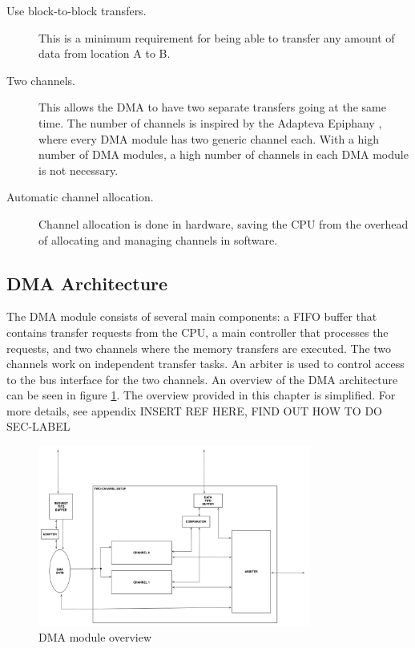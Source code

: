 \begin{description}
	\item[Use block-to-block transfers.] This is a minimum requirement for being
	able to transfer any amount of data from location A to B.
	\item[Two channels.] This allows the DMA to have two separate transfers going
	at the same time.
	The number of channels is inspired by the Adapteva Epiphany \cite{epiphany}, where every DMA module has two generic channel each.
	With a high number of DMA modules, a high number of channels in each DMA module is not necessary.
	\item[Automatic channel allocation.] Channel allocation is done in hardware,
	saving the CPU from the overhead of allocating and managing channels in software.
\end{description}

\subsection{DMA Architecture}

The DMA module consists of several main components: a FIFO buffer that contains transfer
requests from the CPU, a main controller that processes the requests, and two channels
where the memory transfers are executed. The two channels work on independent transfer
tasks. An arbiter is used to control access to the bus interface for the two channels.
An overview of the DMA architecture can be seen in figure \ref{fig:DMATopView}.
The overview provided in this chapter is simplified.
For more details, see appendix  INSERT REF HERE, FIND OUT HOW TO DO SEC-LABEL

\begin{figure}[htb]
    \centering
    \includegraphics[width=0.8\textwidth]{Figures/DMA/TopViewFinalSimple}
    \caption{DMA module overview}
    \label{fig:DMATopView}
\end{figure}


